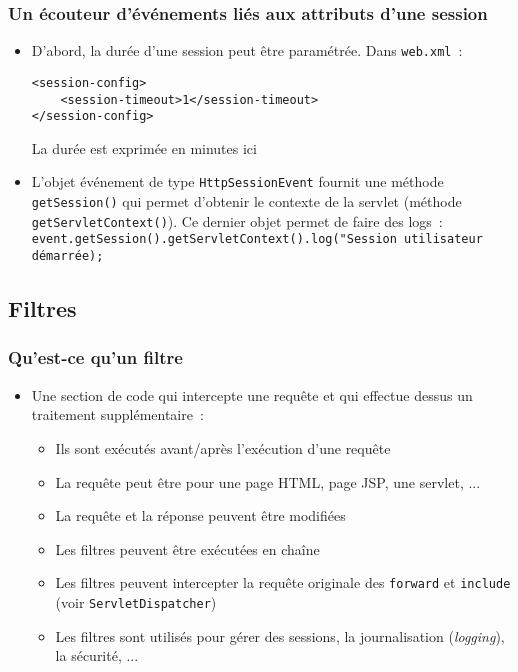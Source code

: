 \documentclass{beamer}
\begin{document}
\begin{frame}[fragile]
	\frametitle{Un écouteur d'événements liés aux attributs d'une session}
	\begin{itemize}
		\item D'abord, la durée d'une session peut être paramétrée. Dans \texttt{web.xml}~:
\begin{lstlisting}
<session-config>
	<session-timeout>1</session-timeout>
</session-config>		
\end{lstlisting}
La durée est exprimée en minutes ici
\item L'objet événement de type \texttt{HttpSessionEvent} fournit une méthode \texttt{getSession()} qui permet d'obtenir le contexte de la servlet (méthode \texttt{getServletContext()}). Ce dernier objet permet de faire des logs~:\\
\footnotesize
\texttt{event.getSession().getServletContext().log("Session utilisateur démarrée);}
\normalsize
	\end{itemize}
\end{frame}

\subsection{Filtres}
\begin{frame}
  \frametitle{Qu'est-ce qu'un filtre}
  \begin{itemize}
  \item Une section de code qui intercepte une requête et qui effectue dessus un traitement supplémentaire~:
  \begin{itemize}
  	\item Ils sont exécutés avant/après l'exécution d'une requête
  	\item La requête peut être pour une page HTML, page JSP, une servlet, ...
  	\item La requête et la réponse peuvent être modifiées
  	\item Les filtres peuvent être exécutées en chaîne
  	\item Les filtres peuvent intercepter la requête originale des \texttt{forward} et \texttt{include} (voir \texttt{ServletDispatcher})
  	\item Les filtres sont utilisés pour gérer des sessions, la journalisation (\textit{logging}), la sécurité, ...
  \end{itemize}
  \end{itemize}
\end{frame}
\end{document}
